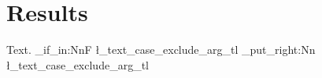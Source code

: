 \flmHeading[toc=true]
\section{Results\flmCitePreSpace{}}{\flmLabels{}}

Text.
\RequirePackage{zref-clever}
\ProvideDocumentCommand{}
\ProvideDocumentCommand\flmCitePreSpace{}{\unskip~}
\ProvideDocumentCommand{}
\def\flm@cite@bookmark#1{\ifx[#1\expandafter\flm@cite@bookmark@note\fi}
\def\flm@cite@bookmark@note#1]#2{}
\AtBeginDocument{\ifdefined\pdfstringdefDisableCommands
  \pdfstringdefDisableCommands{%
    \def\flmCitePreSpace{}%
    \let\flmCite\flm@cite@bookmark
    \def\flmRefCite#1#2{}%
  }\fi}
\ExplSyntaxOn
\tl_if_in:NnF \l_text_case_exclude_arg_tl { \flmCite } { \tl_put_right:Nn \l_text_case_exclude_arg_tl { \flmCite } }
